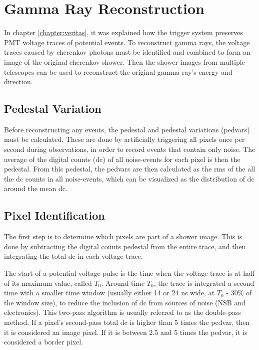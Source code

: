 \cleartooddpage[\thispagestyle{empty}]
\chapter{Gamma Ray Reconstruction}\label{ch:grrecon}

In chapter \ref{chapter:veritas}, it was explained how the trigger system preserves PMT voltage traces of potential events.
To reconstruct gamma rays, the voltage traces caused by cherenkov photons must be identified and combined to form an image of the original cherenkov shower.
Then the shower images from multiple telescopes can be used to reconstruct the original gamma ray's energy and direction.

\section{Pedestal Variation}
  Before reconstructing any events, the pedestal and pedestal variations (pedvars) must be calculated.
  These are done by artificially triggering all pixels once per second during observations, in order to record events that contain only noise.
  The average of the digital counts (dc) of all noise-events for each pixel is then the pedestal.
  From this pedestal, the pedvars are then calculated as the rms of the all the dc counts in all noise-events, which can be visualized as the distribution of dc around the mean dc.

\section{Pixel Identification}
  The first step is to determine which pixels are part of a shower image.
  This is done by subtracting the digital counts pedestal from the entire trace, and then integrating the total dc in each voltage trace.

  The start of a potential voltage pulse is the time when the voltage trace is at half of its maximum value, called $T_{0}$.
  Around time $T_{0}$, the trace is integrated a second time with a smaller time window (usually either 14 or 24 ns wide, at $T_0$ - 30\% of the window size), to reduce the inclusion of dc from sources of noise (NSB and electronics).
  This two-pass algorithm is usually referred to as the double-pass method\cite{doublepass}.
  If a pixel's second-pass total dc is higher than 5 times the pedvar, then it is considered an image pixel.
  If it is between 2.5 and 5 times the pedvar, it is considered a border pixel.

